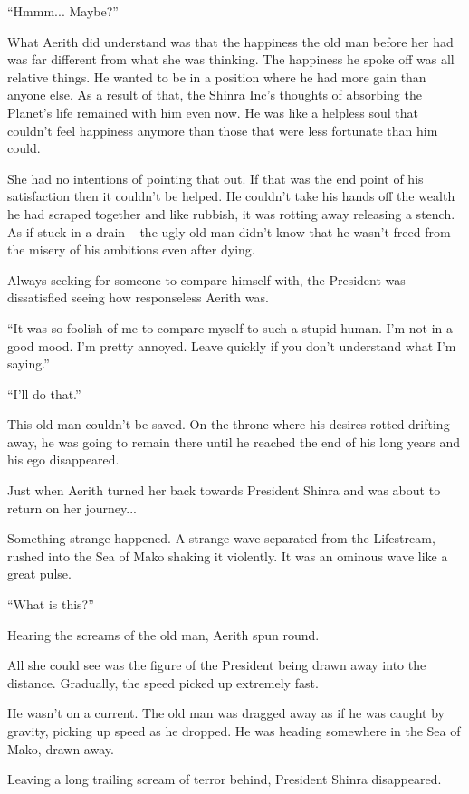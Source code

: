 \documentclass[oneside]{book}
\begin{document}
“Hmmm... Maybe?”

What Aerith did understand was that the happiness the old man before her had was far different from what she was thinking. The happiness he spoke off was all relative things. He wanted to be in a position where he had more gain than anyone else. As a result of that, the Shinra Inc's thoughts of absorbing the Planet's life remained with him even now. He was like a helpless soul that couldn't feel happiness anymore than those that were less fortunate than him could.

She had no intentions of pointing that out. If that was the end point of his satisfaction then it couldn't be helped. He couldn't take his hands off the wealth he had scraped together and like rubbish, it was rotting away releasing a stench. As if stuck in a drain – the ugly old man didn't know that he wasn't freed from the misery of his ambitions even after dying.

Always seeking for someone to compare himself with, the President was dissatisfied seeing how responseless Aerith was.

“It was so foolish of me to compare myself to such a stupid human. I'm not in a good mood. I'm pretty annoyed. Leave quickly if you don't understand what I'm saying.”

“I'll do that.”

This old man couldn't be saved. On the throne where his desires rotted drifting away, he was going to remain there until he reached the end of his long years and his ego disappeared.

Just when Aerith turned her back towards President Shinra and was about to return on her journey...

Something strange happened. A strange wave separated from the Lifestream, rushed into the Sea of Mako shaking it violently. It was an ominous wave like a great pulse.

“What is this?”

Hearing the screams of the old man, Aerith spun round.

All she could see was the figure of the President being drawn away into the distance. Gradually, the speed picked up extremely fast.

He wasn't on a current. The old man was dragged away as if he was caught by gravity, picking up speed as he dropped. He was heading somewhere in the Sea of Mako, drawn away.

Leaving a long trailing scream of terror behind, President Shinra disappeared.
\end{document}
